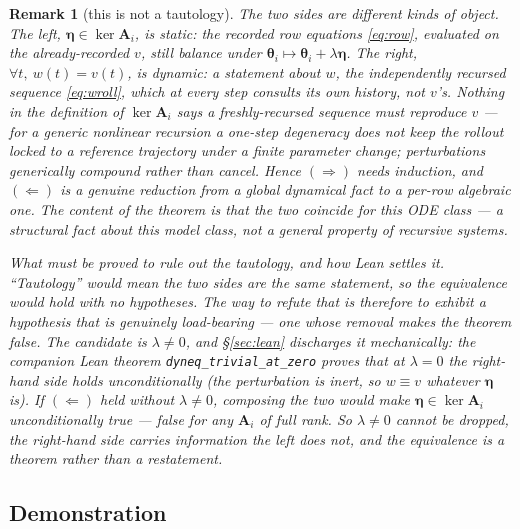 \documentclass[11pt]{article}
\newcommand{\Mat}[1]{\mathbf{#1}}
\newcommand{\A}{\Mat{A}}
\newcommand{\thet}{\boldsymbol{\theta}}
\newtheorem{remark}{Remark}
\begin{document}
\begin{remark}[this is not a tautology]
\label{rem:nottaut}
The two sides are different kinds of object. The left, $\boldsymbol\eta\in\ker\A_i$,
is \emph{static}: the recorded row equations \eqref{eq:row}, evaluated on the
\emph{already-recorded} $v$, still balance under
$\thet_i\mapsto\thet_i+\lambda\boldsymbol\eta$. The right, $\forall t,\
w(t)=v(t)$, is \emph{dynamic}: a statement about $w$, the independently
recursed sequence \eqref{eq:wroll}, which at every step consults its own
history, not $v$'s. Nothing in the definition of $\ker\A_i$ says a
freshly-recursed sequence must reproduce $v$ --- for a generic nonlinear
recursion a one-step degeneracy does \emph{not} keep the rollout locked to a
reference trajectory under a \emph{finite} parameter change; perturbations
generically compound rather than cancel. Hence $(\Rightarrow)$ needs
induction, and $(\Leftarrow)$ is a genuine reduction from a global dynamical
fact to a per-row algebraic one. The content of the theorem is that the two
coincide \emph{for this ODE class} --- a structural fact about this model
class, not a general property of recursive systems.

\emph{What must be proved to rule out the tautology, and how Lean settles it.}
``Tautology'' would mean the two sides are the same statement, so the
equivalence would hold \emph{with no hypotheses}. The way to refute that is
therefore to exhibit a hypothesis that is genuinely load-bearing --- one
whose removal makes the theorem false. The candidate is $\lambda\neq0$, and
\S\ref{sec:lean} discharges it mechanically: the companion Lean theorem
\texttt{dyneq\_trivial\_at\_zero} proves that at $\lambda=0$ the right-hand
side holds \emph{unconditionally} (the perturbation is inert, so $w\equiv
v$ whatever $\boldsymbol\eta$ is). If $(\Leftarrow)$ held without
$\lambda\neq0$, composing the two would make $\boldsymbol\eta\in\ker\A_i$
unconditionally true --- false for any $\A_i$ of full rank. So
$\lambda\neq0$ cannot be dropped, the right-hand side carries information
the left does not, and the equivalence is a theorem rather than a
restatement.
\end{remark}

\subsection{Demonstration}
\end{document}
